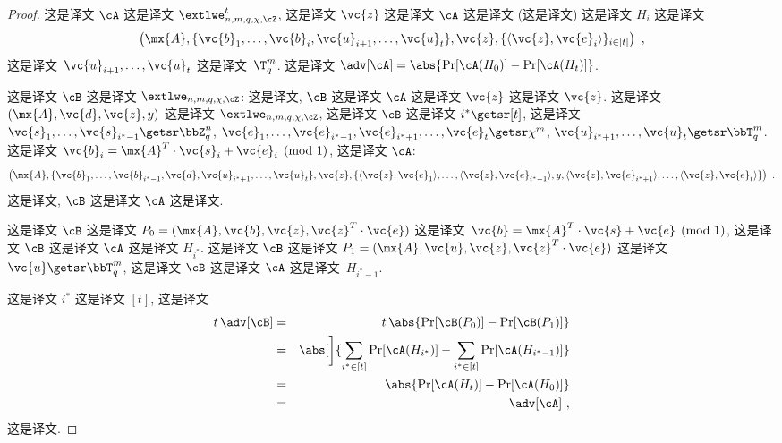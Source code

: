 \begin{proof}
这是译文 $\cA$ 这是译文 $\extlwe^t_{n,m,q,\chi,\cZ}$, 这是译文 $\vc{z}$ 这是译文 $\cA$ 这是译文 (这是译文) 这是译文 $H_i$ 这是译文 \[
\left(\mx{A}, \{\vc{b}_1, \ldots, \vc{b}_i, \vc{u}_{i+1}, \dots, \vc{u}_t\}, \vc{z}, \{\langle\vc{z}, \vc{e}_i\rangle\}_{i\in[t]} \right)~,\]  这是译文~$\vc{u}_{i+1}, \dots, \vc{u}_t$ 这是译文~$\T_q^m$. 这是译文 $\adv[\cA] = \abs{\Pr[\cA(H_0)]- \Pr[\cA(H_t)]}$.

这是译文 $\cB$ 这是译文 $\extlwe_{n,m,q,\chi,\cZ}$: 这是译文, $\cB$ 这是译文 $\cA$ 这是译文 $\vc{z}$ 这是译文 $\vc{z}$. 这是译文 $(\mx{A}, \vc{d}, \vc{z}, y)$ 这是译文 $\extlwe_{n,m,q,\chi,\cZ}$, 这是译文 $\cB$ 这是译文 $i^* \getsr [t]$, 这是译文 $\vc{s}_1, \ldots, \vc{s}_{i^*-1}\getsr \bbZ^n_q$, $\vc{e}_1, \ldots, \vc{e}_{i^*-1}, \vc{e}_{i^*+1}, \ldots, \vc{e}_t \getsr \chi^m$, $\vc{u}_{i^*+1}, \ldots, \vc{u}_t \getsr \bbT_q^m$. 这是译文 $\vc{b}_i = \mx{A}^T\cdot\vc{s}_i+\vc{e}_i\pmod{1}$, 这是译文 $\cA$: \[
\left(\mx{A}, \{ \vc{b}_1, \ldots, \vc{b}_{i^*-1}, \vc{d}, \vc{u}_{i^*+1}, \ldots, \vc{u}_t\}, \vc{z}, \{\langle\vc{z},\vc{e}_1\rangle, \ldots,\langle\vc{z}, \vc{e}_{i^*-1}\rangle, y, \langle\vc{z}, \vc{e}_{i^*+1}\rangle, \ldots, \langle\vc{z}, \vc{e}_t\rangle  \} \right)~.
\] 这是译文, $\cB$ 这是译文 $\cA$ 这是译文.

这是译文 $\cB$ 这是译文 $P_0=(\mx{A}, \vc{b}, \vc{z}, \vc{z}^T \cdot \vc{e})$ 这是译文~$\vc{b} = \mx{A}^T\cdot\vc{s}+\vc{e}\pmod{1}$, 这是译文 $\cB$ 这是译文 $\cA$ 这是译文 $H_{i^*}$. 这是译文 $\cB$ 这是译文 $P_1 = (\mx{A}, \vc{u}, \vc{z}, \vc{z}^T \cdot \vc{e})$ 这是译文~$\vc{u} \getsr \bbT_q^m$, 这是译文 $\cB$ 这是译文 $\cA$ 这是译文~$H_{i^*-1}$.

这是译文 $i^*$ 这是译文 $[t]$, 这是译文 \begin{eqnarray*}
t \, \adv[\cB] & = & t \, \abs{\Pr[\cB(P_0)] - \Pr[\cB(P_1)]}\\
  & = &
	\abs[\bigg]{{\sum_{i^*\in[t]} \Pr[\cA(H_{i^*})] - \sum_{i^*\in[t]} \Pr[\cA(H_{i^*-1})]}} \\
	& = &
	\abs{\Pr[\cA(H_{t})]- \Pr[\cA(H_{0})] } \\
	& = & \adv[\cA]~,
\end{eqnarray*} 这是译文.
\end{proof}




